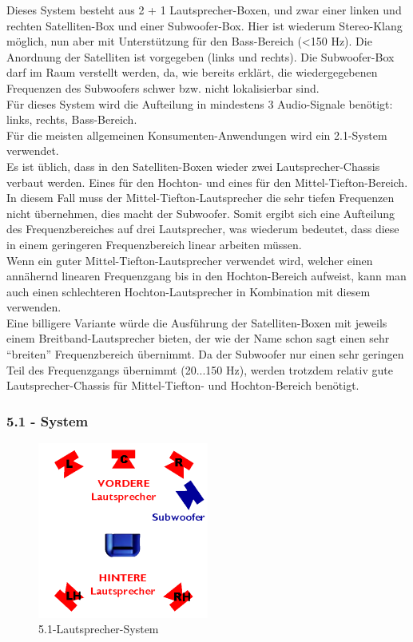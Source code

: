Dieses System besteht aus 2 + 1 Lautsprecher-Boxen, und zwar einer linken und rechten Satelliten-Box und einer Subwoofer-Box.
Hier ist wiederum Stereo-Klang möglich, nun aber mit Unterstützung für den Bass-Bereich (<150 Hz).
Die Anordnung der Satelliten ist vorgegeben (links und rechts).
Die Subwoofer-Box darf im Raum verstellt werden, da, wie bereits erklärt, die wiedergegebenen Frequenzen des Subwoofers schwer bzw. nicht lokalisierbar sind.\\
Für dieses System wird die Aufteilung in mindestens 3 Audio-Signale benötigt:
links, rechts, Bass-Bereich.\\
Für die meisten allgemeinen Konsumenten-Anwendungen wird ein 2.1-System verwendet.\\ 
Es ist üblich, dass in den Satelliten-Boxen wieder zwei Lautsprecher-Chassis verbaut werden.
Eines für den Hochton- und eines für den Mittel-Tiefton-Bereich.
In diesem Fall muss der Mittel-Tiefton-Lautsprecher die sehr tiefen Frequenzen nicht übernehmen, dies macht der Subwoofer.
Somit ergibt sich eine Aufteilung des Frequenzbereiches auf drei Lautsprecher, was wiederum bedeutet, dass diese in einem geringeren Frequenzbereich linear arbeiten müssen.\\
Wenn ein guter Mittel-Tiefton-Lautsprecher verwendet wird, welcher einen annähernd linearen Frequenzgang bis in den Hochton-Bereich aufweist, kann man auch einen schlechteren Hochton-Lautsprecher in Kombination mit diesem verwenden.\\
Eine billigere Variante würde die Ausführung der Satelliten-Boxen mit jeweils einem Breitband-Lautsprecher bieten, der wie der Name schon sagt einen sehr \enquote{breiten} Frequenzbereich übernimmt.
Da der Subwoofer nur einen sehr geringen Teil des Frequenzgangs übernimmt (20...150 Hz), werden trotzdem relativ gute Lautsprecher-Chassis für Mittel-Tiefton- und Hochton-Bereich benötigt.



\subsubsection*{5.1 - System}
\begin{figure} [H]
	\centering
	\includegraphics[width=0.5\textwidth]{img/Grundlagen/Mehrweg-Lautsprechersysteme/DOLBYDigital51-cut.jpg}
	\caption[5.1-Lautsprecher-System]{5.1-Lautsprecher-System\footnotemark}
	\label{fig:3.2.6}
\end{figure}

